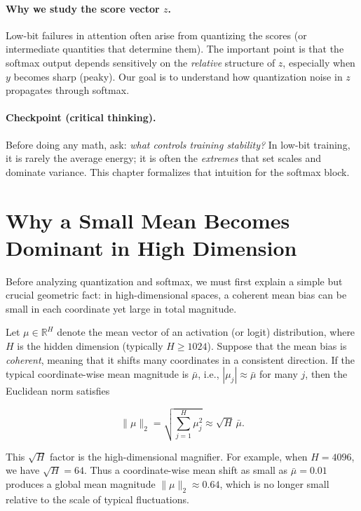 \paragraph{Why we study the score vector $z$.}
Low-bit failures in attention often arise from quantizing the scores (or intermediate
quantities that determine them). The important point is that the softmax output
depends sensitively on the \emph{relative} structure of $z$, especially when $y$
becomes sharp (peaky). Our goal is to understand how quantization noise in $z$
propagates through softmax.

\paragraph{Checkpoint (critical thinking).}
Before doing any math, ask: \emph{what controls training stability?} In low-bit
training, it is rarely the average energy; it is often the \emph{extremes} that set
scales and dominate variance. This chapter formalizes that intuition for the softmax
block.

\section*{Why a Small Mean Becomes Dominant in High Dimension}

Before analyzing quantization and softmax, we must first explain a simple but
crucial geometric fact: in high-dimensional spaces, a coherent mean bias can be
small in each coordinate yet large in total magnitude.

Let $\mu \in \mathbb{R}^H$ denote the mean vector of an activation (or logit)
distribution, where $H$ is the hidden dimension (typically $H \ge 1024$).
Suppose that the mean bias is \emph{coherent}, meaning that it shifts many
coordinates in a consistent direction.
If the typical coordinate-wise mean magnitude is $\bar{\mu}$, i.e.,
$|\mu_j| \approx \bar{\mu}$ for many $j$, then the Euclidean norm satisfies

\begin{equation}
\|\mu\|_2
=
\sqrt{\sum_{j=1}^{H} \mu_j^2}
\approx
\sqrt{H}\,\bar{\mu}.
\label{eq:mu_scaling}
\end{equation}

This $\sqrt{H}$ factor is the high-dimensional magnifier.
For example, when $H=4096$, we have $\sqrt{H}=64$.
Thus a coordinate-wise mean shift as small as $\bar{\mu}=0.01$ produces a global
mean magnitude $\|\mu\|_2 \approx 0.64$, which is no longer small relative to the
scale of typical fluctuations.


